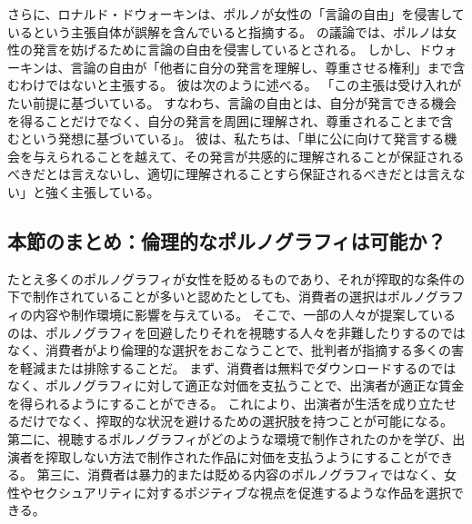 \documentclass[paper=a4,book,openany]{jlreq}
\newcommand{\ig}[1]{}           %
\begin{document}
さらに、ロナルド・ドウォーキン\ig{Ronald Dworkin}は、ポルノが女性の「言論の自由」を侵害しているという主張自体が誤解を含んでいると指摘する。
の議論では、ポルノは女性の発言を妨げるために言論の自由を侵害しているとされる。
しかし、ドウォーキン\ig{Ronald Dworkin}は、言論の自由が「他者に自分の発言を理解し、尊重させる権利」まで含むわけではないと主張する。
彼は次のように述べる。
「この主張は受け入れがたい前提に基づいている。
すなわち、言論の自由とは、自分が発言できる機会を得ることだけでなく、自分の発言を周囲に理解され、尊重されることまで含むという発想に基づいている」。
彼は、私たちは、「単に公に向けて発言する機会を与えられることを越えて、その発言が共感的に理解されることが保証されるべきだとは言えないし、適切に理解されることすら保証されるべきだとは言えない」と強く主張している\citep[p.232]{dworkin96:_freed_law}。

\subsection{本節のまとめ：倫理的なポルノグラフィは可能か？}

たとえ多くのポルノグラフィが女性を貶めるものであり、それが搾取的な条件の下で制作されていることが多いと認めたとしても、消費者の選択はポルノグラフィの内容や制作環境に影響を与えている。
そこで、一部の人々が提案しているのは、ポルノグラフィを回避したりそれを視聴する人々を非難したりするのではなく、消費者がより倫理的な選択をおこなうことで、批判者が指摘する多くの害を軽減または排除することだ。
まず、消費者は無料でダウンロードするのではなく、ポルノグラフィに対して適正な対価を支払うことで、出演者が適正な賃金を得られるようにすることができる。
これにより、出演者が生活を成り立たせるだけでなく、搾取的な状況を避けるための選択肢を持つことが可能になる。
第二に、視聴するポルノグラフィがどのような環境で制作されたのかを学び、出演者を搾取しない方法で制作された作品に対価を支払うようにすることができる。
第三に、消費者は暴力的または貶める内容のポルノグラフィではなく、女性やセクシュアリティに対するポジティブな視点を促進するような作品を選択できる。
\end{document}
